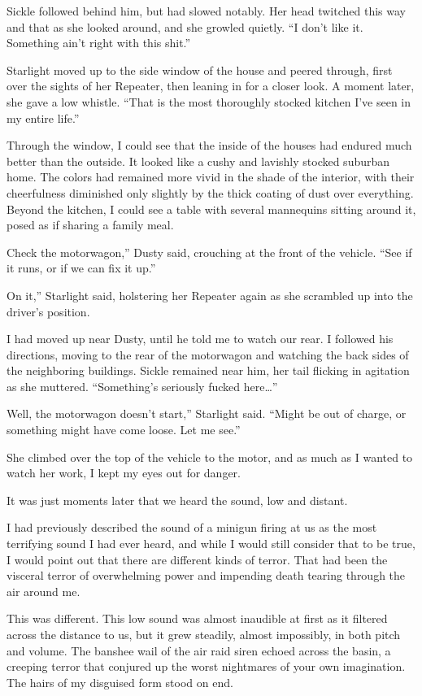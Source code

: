 Sickle followed behind him, but had slowed notably. Her head twitched this way and that as she looked around, and she growled quietly. “I don’t like it. Something ain’t right with this shit.”

Starlight moved up to the side window of the house and peered through, first over the sights of her Repeater, then leaning in for a closer look. A moment later, she gave a low whistle. “That is the most thoroughly stocked kitchen I’ve seen in my entire life.”

Through the window, I could see that the inside of the houses had endured much better than the outside. It looked like a cushy and lavishly stocked suburban home. The colors had remained more vivid in the shade of the interior, with their cheerfulness diminished only slightly by the thick coating of dust over everything. Beyond the kitchen, I could see a table with several mannequins sitting around it, posed as if sharing a family meal.

\leavevmode{}Check the motorwagon,” Dusty said, crouching at the front of the vehicle. “See if it runs, or if we can fix it up.”

\leavevmode{}On it,” Starlight said, holstering her Repeater again as she scrambled up into the driver’s position.

I had moved up near Dusty, until he told me to watch our rear. I followed his directions, moving to the rear of the motorwagon and watching the back sides of the neighboring buildings. Sickle remained near him, her tail flicking in agitation as she muttered. “Something’s seriously fucked here…”

\leavevmode{}Well, the motorwagon doesn’t start,” Starlight said. “Might be out of charge, or something might have come loose. Let me see.”

She climbed over the top of the vehicle to the motor, and as much as I wanted to watch her work, I kept my eyes out for danger.

It was just moments later that we heard the sound, low and distant.

I had previously described the sound of a minigun firing at us as the most terrifying sound I had ever heard, and while I would still consider that to be true, I would point out that there are different kinds of terror. That had been the visceral terror of overwhelming power and impending death tearing through the air around me.

This was different. This low sound was almost inaudible at first as it filtered across the distance to us, but it grew steadily, almost impossibly, in both pitch and volume. The banshee wail of the air raid siren echoed across the basin, a creeping terror that conjured up the worst nightmares of your own imagination. The hairs of my disguised form stood on end.


